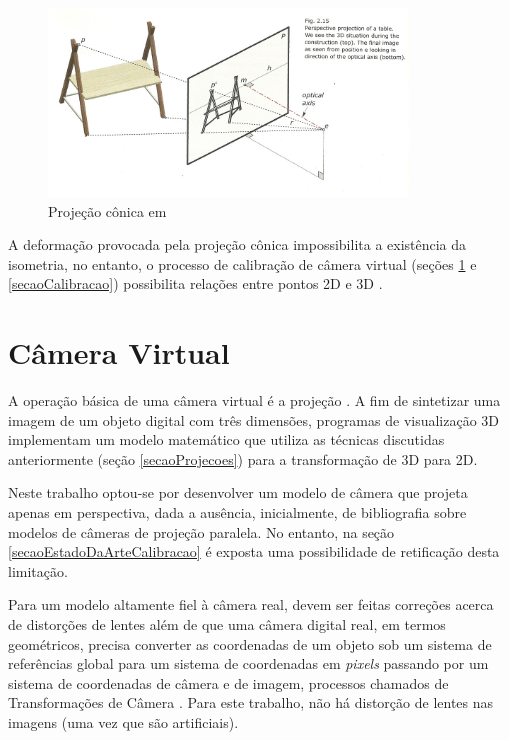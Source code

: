 			\begin{figure}[!htb]
				\centering
				\includegraphics[height=5cm]{imagens/projecaoConica.jpg}
				\caption{Projeção cônica em \cite{archiGeoBook}}
				\label{imagemProjecaoConica}
			\end{figure}
			
			A deformação provocada pela projeção cônica impossibilita a existência da isometria, no entanto, o processo de calibração de câmera virtual (seções \ref{secaoCamera} e \ref{secaoCalibracao}) possibilita relações entre pontos 2D e 3D \cite{juizVirtual}.
	
	\section{Câmera Virtual}
		\label{secaoCamera}
	
		A operação básica de uma câmera virtual é a projeção \cite{fundCompGraf}. A fim de sintetizar uma imagem de um objeto digital com três dimensões, programas de visualização 3D implementam um modelo matemático que utiliza as técnicas discutidas anteriormente (seção \ref{secaoProjecoes}) para a transformação de 3D para 2D.
		
		Neste trabalho optou-se por desenvolver um modelo de câmera que projeta apenas em perspectiva, dada a ausência, inicialmente, de bibliografia sobre modelos de câmeras de projeção paralela. No entanto, na seção \ref{secaoEstadoDaArteCalibracao} é exposta uma possibilidade de retificação desta limitação.
		
		Para um modelo altamente fiel à câmera real, devem ser feitas correções acerca de distorções de lentes \cite{animation} além de que uma câmera digital real, em termos geométricos, precisa converter as coordenadas de um objeto sob um sistema de referências global para um sistema de coordenadas em \textit{pixels} passando por um sistema de coordenadas de câmera e de imagem, processos chamados de Transformações de Câmera \cite{foto3D}. Para este trabalho, não há distorção de lentes nas imagens (uma vez que são artificiais).
		
